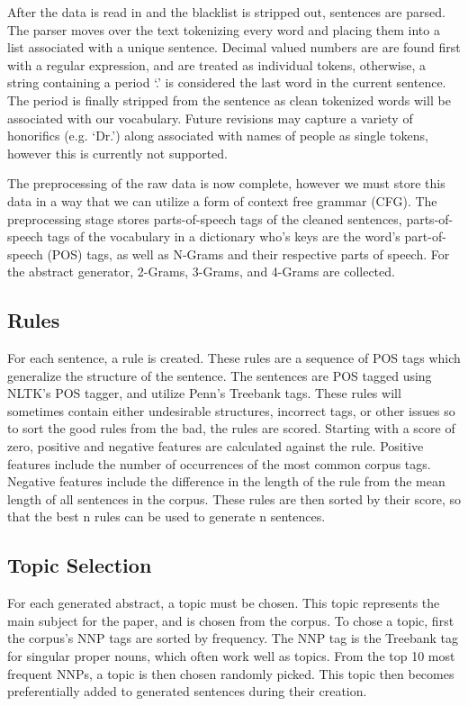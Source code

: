\documentclass[letterpaper, 10 pt, conference]{ieeeconf}  %
\begin{document}
After the data is read in and the blacklist is stripped out, sentences are parsed. The parser moves over the text tokenizing every word and placing them into a list associated with a unique sentence. Decimal valued numbers are are found first with a regular expression, and are treated as individual tokens, otherwise, a string containing a period ‘.’ is considered the last word in the current sentence. The period is finally stripped from the sentence as clean tokenized words will be associated with our vocabulary. Future revisions may capture a variety of honorifics (e.g. ‘Dr.’) along associated with names of people as single tokens, however this is currently not supported.

The preprocessing of the raw data is now complete, however we must store this data in a way that we can utilize a form of context free grammar (CFG). The preprocessing stage stores parts-of-speech tags of the cleaned sentences, parts-of-speech tags of the vocabulary in a dictionary who's keys are the word's part-of-speech (POS) tags, as well as N-Grams and their respective parts of speech. For the abstract generator, 2-Grams, 3-Grams, and 4-Grams are collected.

\subsection{Rules}

For each sentence, a rule is created. These rules are a sequence of POS tags which generalize the structure of the sentence. The sentences are POS tagged using NLTK's POS tagger, and utilize Penn's Treebank tags. These rules will sometimes contain either undesirable structures, incorrect tags, or other issues so to sort the good rules from the bad, the rules are scored. Starting with a score of zero, positive and negative features are calculated against the rule. Positive features include the number of occurrences of the most common corpus tags. Negative features include the difference in the length of the rule from the mean length of all sentences in the corpus. These rules are then sorted by their score, so that the best n rules can be used to generate n sentences.

\subsection{Topic Selection}

For each generated abstract, a topic must be chosen. This topic represents the main subject for the paper, and is chosen from the corpus. To chose a topic, first the corpus's NNP tags are sorted by frequency. The NNP tag is the Treebank tag for singular proper nouns, which often work well as topics. From the top 10 most frequent NNPs, a topic is then chosen randomly picked. This topic then becomes preferentially added to generated sentences during their creation.
\end{document}
